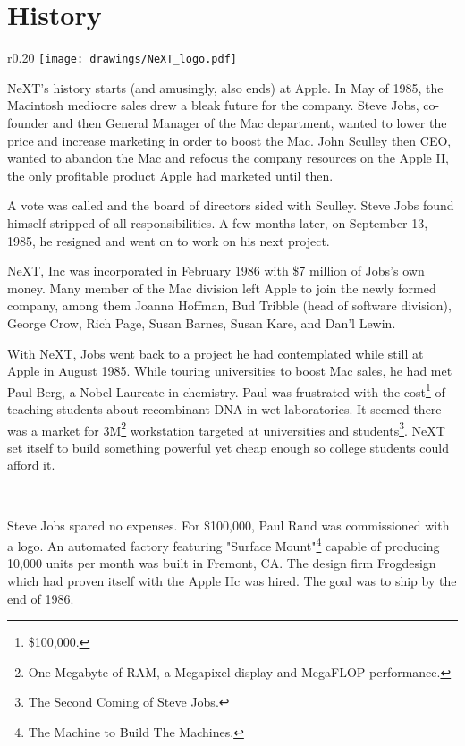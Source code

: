 \section{History}

\begin{wrapfigure}[8]{r}{0.20\textwidth}
\centering
\texttt{[image: drawings/NeXT\_logo.pdf]}
\end{wrapfigure}
\par
NeXT's history starts (and amusingly, also ends) at Apple. In May of 1985, the Macintosh mediocre sales drew a bleak future for the company. Steve Jobs, co-founder and then General Manager of the Mac department, wanted to lower the price and increase marketing in order to boost the Mac. John Sculley then CEO, wanted to abandon the Mac and refocus the company resources on the Apple II, the only profitable product Apple had marketed until then.\\
\par
 A vote was called and the board of directors sided with Sculley. Steve Jobs found himself stripped of all responsibilities. A few months later, on September 13, 1985, he resigned and went on to work on his next project.\\
\par
NeXT, Inc was incorporated in February 1986 with \$7 million of Jobs's own money. Many member of the Mac division left Apple to join the newly formed company, among them  Joanna Hoffman, Bud Tribble (head of software division), George Crow, Rich Page, Susan Barnes, Susan Kare, and Dan'l  Lewin.\\ 
\par
With NeXT, Jobs went back to a project he had contemplated while still at Apple in August 1985. While touring universities to boost Mac sales, he had met Paul Berg, a Nobel Laureate in chemistry. Paul was frustrated with the cost\footnote{\$100,000.} of teaching students about recombinant DNA in wet laboratories. It seemed there was a market for 3M\footnote{One Megabyte of RAM, a Megapixel display and MegaFLOP performance.} workstation targeted at universities and students\footnote{The Second Coming of Steve Jobs.}. NeXT set itself to build something powerful yet cheap enough so college students could afford it.\\
\par
{}\\
\par
Steve Jobs spared no expenses. For \$100,000, Paul Rand was commissioned with a logo. An automated factory featuring "Surface Mount"\footnote{The Machine to Build The Machines.} capable of producing 10,000 units per month was built in Fremont, CA. The design firm Frogdesign which had proven itself with the Apple IIc was hired. The goal was to ship by the end of 1986.\\
